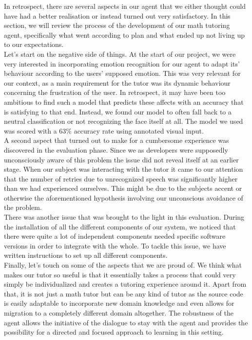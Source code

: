 In retrospect, there are several aspects in our agent that we either thought could have had a better realisation or instead turned out very satisfactory. In this section, we will review the process of the development of our math tutoring agent, specifically what went according to plan and what ended up not living up to our expectations.\\

\noindent Let's start on the negative side of things. At the start of our project, we were very interested in incorporating emotion recognition for our agent to adapt its’ behaviour according to the users’ supposed emotion. This was very relevant for our context, as a main requirement for the tutor was its dynamic behaviour concerning the frustration of the user. In retrospect, it may have been too ambitious to find such a model that predicts these affects with an accuracy that is satisfying to that end. Instead, we found our model to often fall back to a neutral classification or not recognizing the face itself at all. The model we used was scored with a 63\% accuracy rate using annotated visual input.\\

\noindent A second aspect that turned out to make for a cumbersome experience was discovered in the evaluation phase. Since we as developers were supposedly unconsciously aware of this problem the issue did not reveal itself at an earlier stage. When our subject was interacting with the tutor it came to our attention that the number of retries due to unrecognized speech was significantly higher than we had experienced ourselves. This might be due to the subjects accent or otherwise the aforementioned hypothesis involving our unconscious avoidance of the problem.\\

\noindent There was another issue that was brought to the light in this evaluation. During the installation of all the different components of our system, we noticed that there were quite a lot of independent components needed specific software versions in order to integrate with the whole. To tackle this issue, we have written instructions to set up all different components.\\

\noindent Finally, let’s touch on some of the aspects that we are proud of. We think what makes our tutor so useful is that it essentially takes a process that could very simply be individualized and creates a tutoring experience around it. Apart from that, it is not just a math tutor but can be any kind of tutor as the source code is easily adaptable to incorporate new domain knowledge and even allows for migration to a completely different domain altogether. The robustness of the agent allows the initiative of the dialogue to stay with the agent and provides the possibility for a directed and focused approach to learning in this setting.